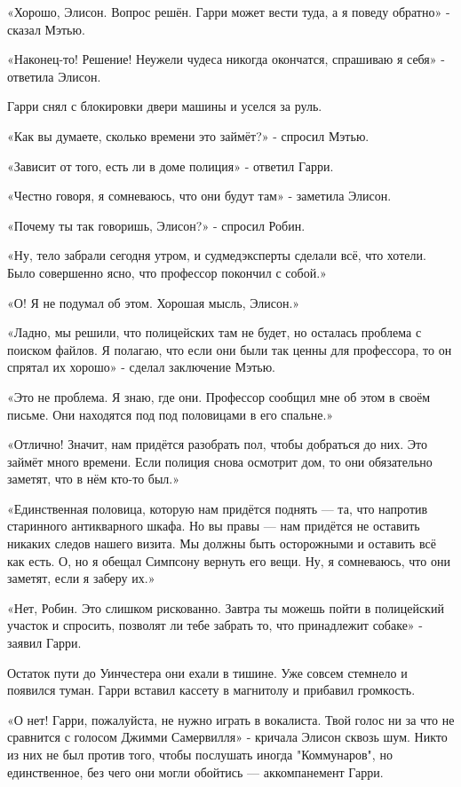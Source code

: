 \documentclass[a5paper, 9pt,
final, openany, twoside=true]{memoir}
\begin{document}
«Хорошо, Элисон. Вопрос решён. Гарри может вести туда, а я поведу обратно» - сказал Мэтью.

«Наконец-то! Решение! Неужели чудеса никогда окончатся, спрашиваю я себя» - ответила Элисон.

Гарри снял с блокировки двери машины и уселся за руль.

«Как вы думаете, сколько времени это займёт?» - спросил Мэтью.

«Зависит от того, есть ли в доме полиция» - ответил Гарри.

«Честно говоря, я сомневаюсь, что они будут там» - заметила Элисон.

«Почему ты так говоришь, Элисон?» - спросил Робин.

«Ну, тело забрали сегодня утром, и судмедэксперты сделали всё, что хотели. Было совершенно ясно, что профессор покончил с собой.»

«О! Я не подумал об этом. Хорошая мысль, Элисон.»

«Ладно, мы решили, что полицейских там не будет, но осталась проблема с поиском файлов. Я полагаю, что если они были так ценны для профессора, то он спрятал их хорошо» - сделал заключение Мэтью.

«Это не проблема. Я знаю, где они. Профессор сообщил мне об этом в своём письме. Они находятся под под половицами в его спальне.»

«Отлично! Значит, нам придётся разобрать пол, чтобы добраться до них. Это займёт много времени. Если полиция снова осмотрит дом, то они обязательно заметят, что в нём кто-то был.»

«Единственная половица, которую нам придётся поднять — та, что напротив старинного антикварного шкафа. Но вы правы — нам придётся не оставить никаких следов нашего визита. Мы должны быть осторожными и оставить всё как есть. О, но я обещал Симпсону вернуть его вещи. Ну, я сомневаюсь, что они заметят, если я заберу их.»

«Нет, Робин. Это слишком рискованно. Завтра ты можешь пойти в полицейский участок и спросить, позволят ли тебе забрать то, что принадлежит собаке» - заявил Гарри.\bigskip

Остаток пути до Уинчестера они ехали в тишине. Уже совсем стемнело и появился туман. Гарри вставил кассету в магнитолу и прибавил громкость.

«О нет! Гарри, пожалуйста, не нужно играть в вокалиста. Твой голос ни за что не сравнится с голосом Джимми Самервилля» - кричала Элисон сквозь шум. Никто из них не был против того, чтобы послушать иногда "Коммунаров", но единственное, без чего они могли обойтись — аккомпанемент Гарри.
\end{document}
